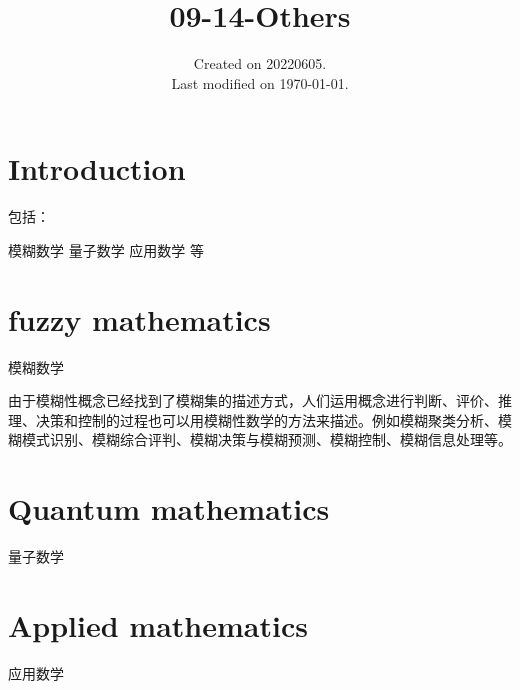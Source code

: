 \documentclass[UTF8]{../09-Mathematics}
\begin{document}
\title{09-14-Others}
\date{Created on 20220605.\\   Last modified on \today.}
\maketitle
\tableofcontents


\chapter{Introduction}

包括：

模糊数学
量子数学
应用数学
等









\chapter{fuzzy mathematics}
模糊数学

由于模糊性概念已经找到了模糊集的描述方式，人们运用概念进行判断、评价、推理、决策和控制的过程也可以用模糊性数学的方法来描述。例如模糊聚类分析、模糊模式识别、模糊综合评判、模糊决策与模糊预测、模糊控制、模糊信息处理等。

\chapter{Quantum mathematics}

量子数学


\chapter{Applied mathematics}
应用数学
\end{document}
